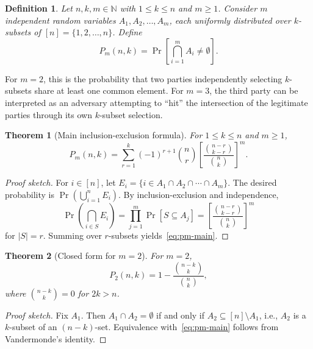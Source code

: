 \documentclass[11pt,a4paper]{article}
\newtheorem{definition}{Definition}
\newtheorem{theorem}{Theorem}
\begin{document}
\begin{definition}\label{def:pmnk}
Let $n, k, m \in \mathbb{N}$ with $1 \leq k \leq n$ and $m \geq 1$. Consider $m$ independent random variables $A_1, A_2, \ldots, A_m$, each uniformly distributed over $k$-subsets of $[n] = \{1, 2, \ldots, n\}$. Define
\[
P_m(n, k) = \Pr\!\left[\bigcap_{i=1}^{m} A_i \neq \emptyset\right].
\]
\end{definition}

For $m = 2$, this is the probability that two parties independently selecting $k$-subsets share at least one common element. For $m = 3$, the third party can be interpreted as an adversary attempting to ``hit'' the intersection of the legitimate parties through its own $k$-subset selection.

\begin{theorem}[Main inclusion-exclusion formula]\label{thm:pm-formula}
For $1 \leq k \leq n$ and $m \geq 1$,
\begin{equation}\label{eq:pm-main}
P_m(n, k) = \sum_{r=1}^{k} (-1)^{r+1} \binom{n}{r} \left[\frac{\binom{n-r}{k-r}}{\binom{n}{k}}\right]^m.
\end{equation}
\end{theorem}

\begin{proof}[Proof sketch]
For $i \in [n]$, let $E_i = \{i \in A_1 \cap A_2 \cap \cdots \cap A_m\}$. The desired probability is $\Pr(\bigcup_{i=1}^{n} E_i)$. By inclusion-exclusion and independence,
\[
\Pr\!\left(\bigcap_{i \in S} E_i\right) = \prod_{j=1}^{m} \Pr[S \subseteq A_j] = \left[\frac{\binom{n-r}{k-r}}{\binom{n}{k}}\right]^m
\]
for $|S| = r$. Summing over $r$-subsets yields~\eqref{eq:pm-main}.
\end{proof}

\begin{theorem}[Closed form for $m = 2$]\label{thm:p2-closed}
For $m = 2$,
\begin{equation}\label{eq:p2-closed}
P_2(n, k) = 1 - \frac{\binom{n-k}{k}}{\binom{n}{k}},
\end{equation}
where $\binom{n-k}{k} = 0$ for $2k > n$.
\end{theorem}

\begin{proof}[Proof sketch]
Fix $A_1$. Then $A_1 \cap A_2 = \emptyset$ if and only if $A_2 \subseteq [n] \setminus A_1$, i.e., $A_2$ is a $k$-subset of an $(n-k)$-set. Equivalence with~\eqref{eq:pm-main} follows from Vandermonde's identity.
\end{proof}
\end{document}
